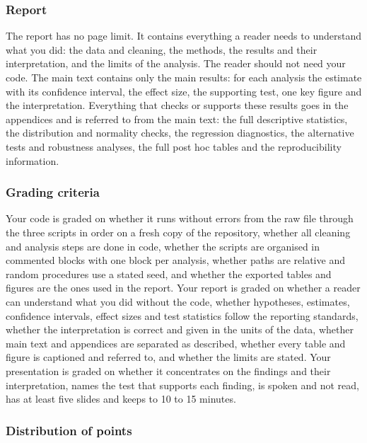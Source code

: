 \documentclass[11pt,a4paper]{article}
\begin{document}
\subsubsection*{Report}

The report has no page limit. It contains everything a reader needs to understand what you did: the data and cleaning, the methods, the results and their interpretation, and the limits of the analysis. The reader should not need your code. The main text contains only the main results: for each analysis the estimate with its confidence interval, the effect size, the supporting test, one key figure and the interpretation. Everything that checks or supports these results goes in the appendices and is referred to from the main text: the full descriptive statistics, the distribution and normality checks, the regression diagnostics, the alternative tests and robustness analyses, the full post hoc tables and the reproducibility information.

\subsubsection*{Grading criteria}

Your code is graded on whether it runs without errors from the raw file through the three scripts in order on a fresh copy of the repository, whether all cleaning and analysis steps are done in code, whether the scripts are organised in commented blocks with one block per analysis, whether paths are relative and random procedures use a stated seed, and whether the exported tables and figures are the ones used in the report. Your report is graded on whether a reader can understand what you did without the code, whether hypotheses, estimates, confidence intervals, effect sizes and test statistics follow the reporting standards, whether the interpretation is correct and given in the units of the data, whether main text and appendices are separated as described, whether every table and figure is captioned and referred to, and whether the limits are stated. Your presentation is graded on whether it concentrates on the findings and their interpretation, names the test that supports each finding, is spoken and not read, has at least five slides and keeps to 10 to 15 minutes.

\subsubsection*{Distribution of points}
\end{document}
